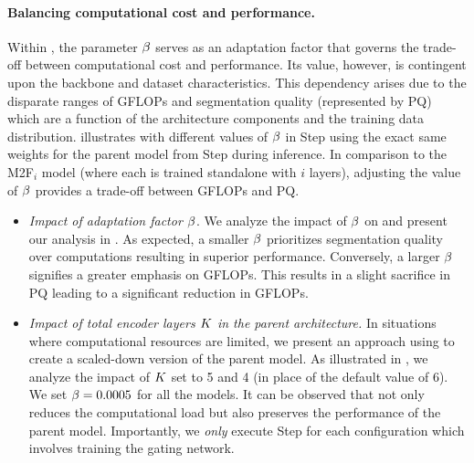 \paragraph{Balancing computational cost and performance.} Within \ours, the parameter $\beta$ serves as an adaptation factor that governs the trade-off between computational cost and performance. Its value, however, is contingent upon the backbone and dataset characteristics. This dependency arises due to the disparate ranges of GFLOPs and segmentation quality (represented by PQ) which are a function of the architecture components and the training data distribution.  illustrates {\ours} with different values of $\beta$ in Step \stepC using the exact same weights for the parent model from Step \stepA during inference. In comparison to the M2F$_i$ model (where each is trained standalone with $i$ layers), adjusting the value of $\beta$ provides a trade-off between GFLOPs and PQ.

\begin{itemize}[topsep=0.0em,leftmargin=*]
\setlength\itemsep{0.0em}
    \item \textit{Impact of adaptation factor $\beta$}. We analyze the impact of $\beta$ on \ours and present our analysis in . As expected, a smaller $\beta$ prioritizes segmentation quality over computations resulting in superior performance. Conversely, a larger $\beta$ signifies a greater emphasis on GFLOPs. This results in a slight sacrifice in PQ leading to a significant reduction in GFLOPs. 
    \item \textit{Impact of total encoder layers $K$ in the parent architecture.} In situations where computational resources are limited, we present an approach using {\ours} to create a scaled-down version of the parent model. As illustrated in , we analyze the impact of $K$ set to 5 and 4 (in place of the default value of 6). We set $\beta=0.0005$ for all the models. It can be observed that {\ours} not only reduces the computational load but also preserves the performance of the parent model. Importantly, we \textit{only} execute Step \stepC for each configuration which involves training the gating network.
\end{itemize}
%

